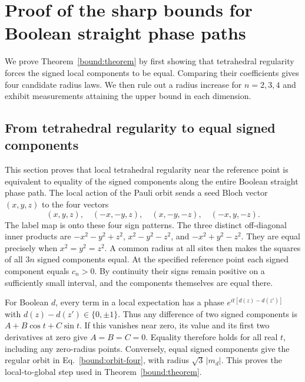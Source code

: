 \section{Proof of the sharp bounds for Boolean straight phase paths}
\label{bound:appendix}

We prove Theorem~\ref{bound:theorem} by first showing that tetrahedral regularity forces the signed local components to be equal. Comparing their coefficients gives four candidate radius laws. We then rule out a radius increase for $n=2,3,4$ and exhibit measurements attaining the upper bound in each dimension.

\subsection{From tetrahedral regularity to equal signed components}
\label{bound:app-regularity}
This section proves that local tetrahedral regularity near the reference point is equivalent to equality of the signed components along the entire Boolean straight phase path. The local action of the Pauli orbit sends a seed Bloch vector $(x,y,z)$
to the four vectors
\begin{equation}
 (x,y,z),\quad(-x,-y,z),\quad(x,-y,-z),\quad(-x,y,-z).
 \label{bound:orbit-four}
\end{equation}
The label map is onto these four sign patterns.  The three distinct
off-diagonal inner products are
$-x^2-y^2+z^2$, $x^2-y^2-z^2$, and $-x^2+y^2-z^2$.
They are equal precisely when $x^2=y^2=z^2$.
A common radius at all sites then makes the squares of all $3n$
signed components equal.  At the specified reference point each signed
component equals $c_n>0$.  By continuity their signs remain positive
on a sufficiently small interval, and the components themselves are
equal there.

For Boolean $d$, every term in a local expectation has a phase
$e^{it[d(z)-d(z')]}$ with $d(z)-d(z')\in\{0,\pm1\}$.
Thus any difference of two signed components is
$A+B\cos t+C\sin t$.  If this vanishes near zero, its value and its
first two derivatives at zero give $A=B=C=0$.
Equality therefore holds for all real $t$, including any zero-radius
points.  Conversely, equal signed components give the regular orbit
in Eq.~\eqref{bound:orbit-four}, with radius
$\sqrt3\,|m_d|$.  This proves the local-to-global step used in
Theorem~\ref{bound:theorem}.


